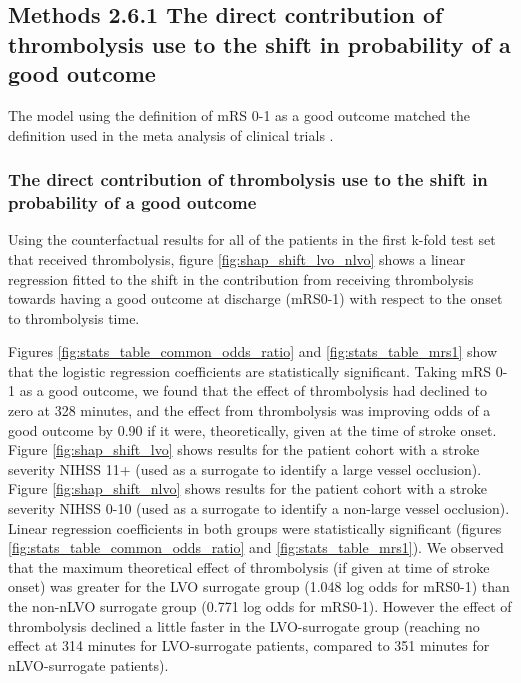 
\subsection{Methods 2.6.1 The direct contribution of thrombolysis use to the shift in probability of a good outcome}

The model using the definition of mRS 0-1 as a good outcome matched the definition used in the meta analysis of clinical trials \cite{emberson_effect_2014}. 


\subsubsection{The direct contribution of thrombolysis use to the shift in probability of a good outcome}

Using the counterfactual results for all of the patients in the first k-fold test set that received thrombolysis, figure \ref{fig:shap_shift_lvo_nlvo} shows a linear regression fitted to the shift in the contribution from receiving thrombolysis towards having a good outcome at discharge (mRS0-1) with respect to the onset to thrombolysis time. 

Figures \ref{fig:stats_table_common_odds_ratio} and \ref{fig:stats_table_mrs1} show that the logistic regression coefficients are statistically significant. Taking mRS 0-1 as a good outcome, we found that the effect of thrombolysis had declined to zero at 328 minutes, and the effect from thrombolysis was improving odds of a good outcome by 0.90 if it were, theoretically, given at the time of stroke onset. Figure \ref{fig:shap_shift_lvo} shows results for the patient cohort with a stroke severity NIHSS 11+ (used as a surrogate to identify a large vessel occlusion). Figure \ref{fig:shap_shift_nlvo} shows results for the patient cohort with a stroke severity NIHSS 0-10 (used as a surrogate to identify a non-large vessel occlusion). Linear regression coefficients in both groups were statistically significant (figures \ref{fig:stats_table_common_odds_ratio} and \ref{fig:stats_table_mrs1}). We observed that the maximum theoretical effect of thrombolysis (if given at time of stroke onset) was greater for the LVO surrogate group (1.048 log odds for mRS0-1) than the non-nLVO surrogate group (0.771 log odds for mRS0-1). However the effect of thrombolysis declined a little faster in the LVO-surrogate group (reaching no effect at 314 minutes for LVO-surrogate patients, compared to 351 minutes for nLVO-surrogate patients).

